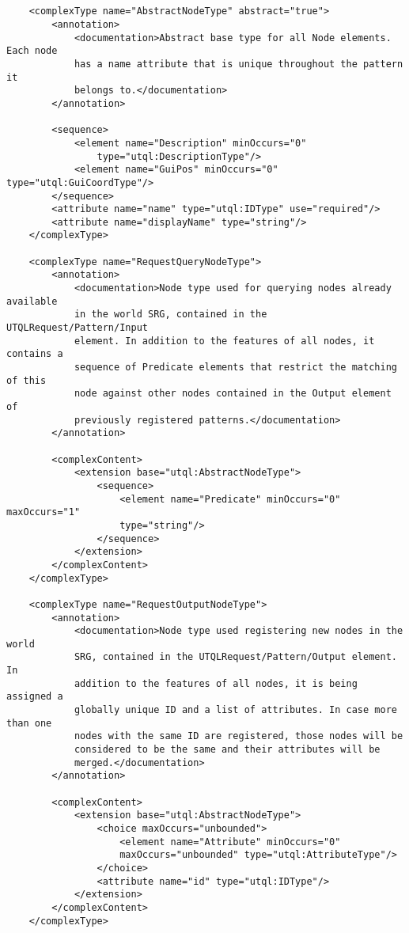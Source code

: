 \documentclass[11pt]{article}
\begin{document}
\begin{Verbatim}[fontsize=\footnotesize,tabsize=2]
    
    
    <complexType name="AbstractNodeType" abstract="true">
        <annotation>
            <documentation>Abstract base type for all Node elements. Each node
            has a name attribute that is unique throughout the pattern it
            belongs to.</documentation>
        </annotation>
        
        <sequence>
            <element name="Description" minOccurs="0"
				type="utql:DescriptionType"/>
            <element name="GuiPos" minOccurs="0" type="utql:GuiCoordType"/>
        </sequence>
        <attribute name="name" type="utql:IDType" use="required"/>
        <attribute name="displayName" type="string"/>
    </complexType>
    
    <complexType name="RequestQueryNodeType">
        <annotation>
            <documentation>Node type used for querying nodes already available
            in the world SRG, contained in the UTQLRequest/Pattern/Input
            element. In addition to the features of all nodes, it contains a
            sequence of Predicate elements that restrict the matching of this
            node against other nodes contained in the Output element of
            previously registered patterns.</documentation>
        </annotation>
        
        <complexContent>
            <extension base="utql:AbstractNodeType">
                <sequence>
                    <element name="Predicate" minOccurs="0" maxOccurs="1"
                    type="string"/>
                </sequence>
            </extension>
        </complexContent>
    </complexType>
    
    <complexType name="RequestOutputNodeType">
        <annotation>
            <documentation>Node type used registering new nodes in the world
            SRG, contained in the UTQLRequest/Pattern/Output element. In
            addition to the features of all nodes, it is being assigned a
            globally unique ID and a list of attributes. In case more than one
            nodes with the same ID are registered, those nodes will be
            considered to be the same and their attributes will be
            merged.</documentation>
        </annotation>
        
        <complexContent>
            <extension base="utql:AbstractNodeType">
                <choice maxOccurs="unbounded">
                    <element name="Attribute" minOccurs="0"
                    maxOccurs="unbounded" type="utql:AttributeType"/>
                </choice>
                <attribute name="id" type="utql:IDType"/>
            </extension>
        </complexContent>
    </complexType>
    

\end{Verbatim}
\end{document}
